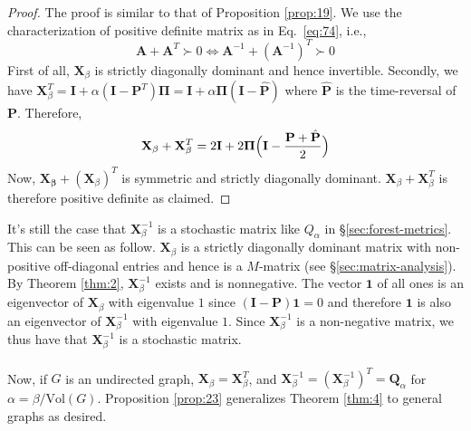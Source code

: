 \begin{proof}
The proof is similar to that of Proposition \ref{prop:19}. 
We use the
characterization of positive definite matrix as in Eq.~\eqref{eq:74},
i.e., 
\begin{equation*}
    \mathbf{A} + \mathbf{A}^{T} \succ 0 \Leftrightarrow
    \mathbf{A}^{-1} + (\mathbf{A}^{-1})^{T} \succ 0
\end{equation*}
First of all, $\mathbf{X}_{\beta}$ is strictly diagonally dominant
and hence invertible. Secondly, we have $\mathbf{X}_{\beta}^{T} =
\mathbf{I} + \alpha (\mathbf{I} - \mathbf{P}^{T}) \bm{\Pi} =
\mathbf{I} + \alpha \bm{\Pi} (\mathbf{I} - \hat{\mathbf{P}})$ where
$\hat{\mathbf{P}}$ is the time-reversal of $\mathbf{P}$. Therefore, 
\begin{equation}
  \label{eq:82}
  \mathbf{X}_{\beta} + \mathbf{X}_{\beta}^{T} = 2 \mathbf{I}
  + 2 \bm{\Pi}\Bigl(\mathbf{I} - \frac{\mathbf{P} + \hat{\mathbf{P}}}{2}
  \Bigr)
\end{equation}
Now, $\mathbf{X_{\beta}} + (\mathbf{X}_{\beta})^{T}$ is symmetric and
strictly diagonally dominant. $\mathbf{X}_\beta +
\mathbf{X}_{\beta}^{T}$ is therefore positive definite as claimed.  
\end{proof}
It's still the case that $\mathbf{X}_{\beta}^{-1}$ is a stochastic
matrix like $Q_{\alpha}$ in \S \ref{sec:forest-metrics}. This can be
seen as follow. $\mathbf{X}_{\beta}$ is a strictly diagonally dominant
matrix with non-positive off-diagonal entries and hence is a
$M$-matrix (see \S \ref{sec:matrix-analysis}). By Theorem \ref{thm:2},
$\mathbf{X}_{\beta}^{-1}$ exists and is nonnegative. The vector
$\bm{1}$ of all ones is an eigenvector of $\mathbf{X}_{\beta}$ with
eigenvalue $1$ since $(\mathbf{I} - \mathbf{P})\bm{1} = 0$ and
therefore $\bm{1}$ is also an eigenvector of $\mathbf{X}_{\beta}^{-1}$
with eigenvalue $1$. Since $\mathbf{X}_{\beta}^{-1}$ is a non-negative
matrix, we thus have that $\mathbf{X}_{\beta}^{-1}$ is a stochastic
matrix. \\ \\
%
%
Now, if $G$ is an undirected graph, $\mathbf{X}_{\beta} =
\mathbf{X}_{\beta}^{T}$, and $\mathbf{X}_{\beta}^{-1} =
(\mathbf{X}_{\beta}^{-1})^{T} = \mathbf{Q}_{\alpha}$ for $\alpha =
\beta/\mathrm{Vol}(G)$. Proposition \ref{prop:23} generalizes
Theorem \ref{thm:4} to general graphs as desired.

